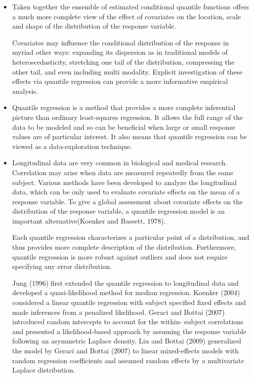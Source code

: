 \documentclass{article}
\begin{document}
\begin{itemize}
\item \cite{koenker2001quantile} Taken together the ensemble of estimated conditional quantile functions offers a much more complete view of the effect of covariates on the location, scale and shape of the distribution of the response variable.\par

Covariates may influence the conditional distribution of the response in myriad other ways: expanding its dispersion as in traditional models of heteroscedasticity, stretching one tail of the distribution, compressing the other tail, and even including multi modality. Explicit investigation of these effects via quantile regression can provide a more informative empirical analysis.\par 


\item \cite{luo2012bayesian} Quantile regression is a method that provides a more complete inferential picture than ordinary least-squares regression. It allows the full range of the data to be modeled and so can be beneficial when large or small response values are of particular interest. It also means that quantile regression can be viewed as a data-exploration technique. \par


\item \cite{fu2012quantile} Longitudinal data are very common in biological and medical research. Correlation may arise when data are measured repeatedly from the same subject. Various methods have been developed to analyze the longitudinal data, which can be only used to evaluate covariate effects on the mean of a response variable. To give a global assessment about covariate effects on the distribution of the response variable, a quantile regression model is an important alternative(Koenker and Bassett, 1978).\par

Each quantile regression characterizes a particular point of a distribution, and thus provides more complete description of the distribution. Furthermore, quantile regression is more robust against outliers and does not require specifying any error distribution.\par

Jung (1996) first extended the quantile regression to longitudinal data and developed a quasi-likelihood method for median regression. Koenker (2004) considered a linear quantile regression with subject specified fixed effects and made inferences from a penalized likelihood. Geraci and Bottai (2007) introduced random intercepts to account for the within- subject correlations and presented a likelihood-based approach by assuming the response variable following an asymmetric Laplace density. Liu and Bottai (2009) generalized the model by Geraci and Bottai (2007) to linear mixed-effects models with random regression coefficients and assumed random effects by a multivariate Laplace distribution.\par



\end{itemize}
\end{document}
